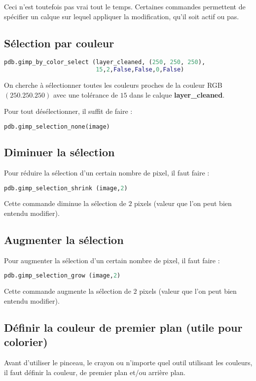 \documentclass[a4paper,twoside]{article}
\begin{document}
\begin{remarque}
Ceci n'est toutefois pas vrai tout le temps. Certaines commandes permettent de spécifier un calque sur lequel appliquer la modification, qu'il soit actif ou pas.
\end{remarque}

\subsection{Sélection par couleur}

\begin{lstlisting}[language=Python]
pdb.gimp_by_color_select (layer_cleaned, (250, 250, 250), 
                          15,2,False,False,0,False)
\end{lstlisting}
On cherche à sélectionner toutes les couleurs proches de la couleur RGB $(250. 250. 250)$ avec une tolérance de $15$ dans le calque \textbf{layer\_cleaned}.

\begin{remarque}
Pour tout désélectionner, il suffit de faire :
\begin{lstlisting}[language=Python]
pdb.gimp_selection_none(image)
\end{lstlisting}
\end{remarque}

\subsection{Diminuer la sélection}
Pour réduire la sélection d'un certain nombre de pixel, il faut faire : 
\begin{lstlisting}[language=Python]
pdb.gimp_selection_shrink (image,2)
\end{lstlisting}
Cette commande diminue la sélection de $2$ pixels (valeur que l'on peut bien entendu modifier).


\subsection{Augmenter la sélection}
Pour augmenter la sélection d'un certain nombre de pixel, il faut faire : 
\begin{lstlisting}[language=Python]
pdb.gimp_selection_grow (image,2)
\end{lstlisting}
Cette commande augmente la sélection de $2$ pixels (valeur que l'on peut bien entendu modifier).

\subsection{Définir la couleur de premier plan (utile pour colorier)}
Avant d'utiliser le pinceau, le crayon ou n'importe quel outil utilisant les couleurs, il faut définir la couleur, de premier plan et/ou arrière plan. 
\end{document}
